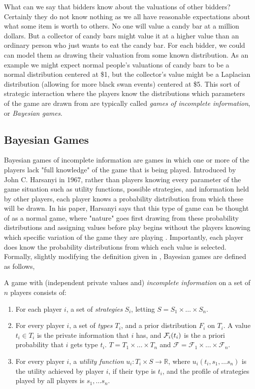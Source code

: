 \documentclass[12pt,twoside]{reedthesis}
\begin{document}
What can we say that bidders know about the valuations of other bidders? Certainly they do not know nothing as we all have reasonable expectations about what some item is worth to others. No one will value a candy bar at a million dollars. But a collector of candy bars might value it at a higher value than an ordinary person who just wants to eat the candy bar. For each bidder, we could can model them as drawing their valuation from some known distribution. As an example we might expect normal people's valuations of candy bars to be a normal distribution centered at \$1, but the collector's value might be a Laplacian distribution (allowing for more black swan events) centered at \$5. This sort of strategic interaction where the players know the distributions which parameters of the game are drawn from are typically called {\em games of incomplete information}, or {\em Bayesian games}.
 
\subsection{Bayesian Games}
Bayesian games of incomplete information are games in which one or more of the players lack "full knowledge" of the game that is being played. Introduced by John C. Harsanyi in 1967, rather than players knowing every parameter of the game situation such as utility functions, possible strategies, and information held by other players, each player knows a probability distribution from which these will be drawn. In his paper, Harsanyi says that this type of game can be thought of as a normal game, where "nature" goes first drawing from these probability distributions and assigning values before play begins without the players knowing which specific variation of the game they are playing \citep{Harsanyi1967}.
 Importantly, each player does know the probability distributions from which each value is selected. Formally, slightly modifying the definition given in \citet{Nisan2007}, Bayesian games are defined as follows,

\begin{dfn}
	A game with (independent private values and) \textit{incomplete information} on a set of $n$ players consists of:
	\begin{enumerate}
		\item For each player $i$, a set of {\em strategies} $S_i$, letting $S = S_1 \times \ldots \times S_n$.
		\item For every player $i$, a set of {\em types $T_i$}, and a prior distribution $F_i$ on $T_i$. A value $t_i \in T_i$ is the private information that $i$ has, and $\mathcal{F}_i(t_i)$ is the a priori probability that $i$ gets type $t_i$. $T = T_1 \times \ldots \times T_n$ and $\mathcal{F} = \mathcal{F}_1 \times \ldots \times \mathcal{F}_n$.
		\item For every player $i$, a \textit{utility function} $u_i : T_i \times S \rightarrow \mathbb{R}$, where $u_i(t_i, s_1, \ldots s_n)$ is the utility achieved by player $i$, if their type is $t_i$, and the profile of strategies played by all players is $s_1, \ldots s_n$.
	\end{enumerate} 
\label{dfn:BayesianGame}
\end{dfn}
\end{document}
